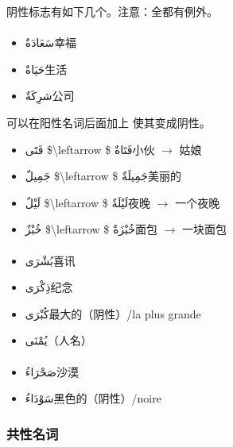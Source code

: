 阴性标志有如下几个。注意：全都有例外。

\paragraph{} 

\begin{itemize}
    \item \ac{سَعَادَةٌ}{幸福}
    \item \ac{حَيَاةٌ}{生活}
    \item \ac{شرِكَةٌ}{公司}
\end{itemize}

可以在阳性名词后面加上  使其变成阴性。

\begin{itemize}
    \item \ac{فَتََى $\leftarrow $ فَتَاةٌ}{小伙 $\rightarrow $ 姑娘}
    \item \ac{جَمِيلٌ $\leftarrow $ جَمِيلَةٌ}{美丽的}
    \item \ac{لَيْلٌ $\leftarrow $ لَيْلَةٌ}{夜晚 $\rightarrow $ 一个夜晚}
    \item \ac{خُبْزٌ $\leftarrow $ خُبْزَةٌ}{面包 $\rightarrow $ 一块面包}
\end{itemize}

\paragraph{}

\begin{itemize}
    \item \ac{بُشْرَى}{喜讯}
    \item \ac{ذِكْرَى}{纪念}
    \item \ac{كُبْرَى}{最大的（阴性）/la plus grande}
    \item \ac{يُمْنَى}{（人名）}
\end{itemize}

\paragraph{}

\begin{itemize}
    \item \ac{صَحْرَاءُ}{沙漠}
    \item \ac{سَوْدَاءُ}{黑色的（阴性）/noire}
\end{itemize}

\subsubsection{共性名词}

